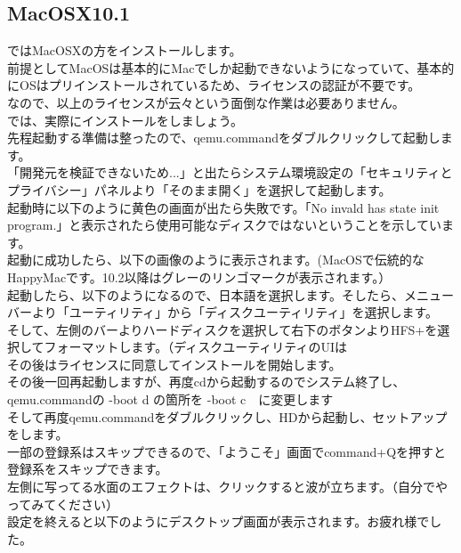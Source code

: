 \documentclass[b5paper,10pt]{jsarticle}
\begin{document}
\begin{multicols*}{3}
\begin{lstlistng}[saitama]
{\subsection{MacOSX10.1}
ではMacOSXの方をインストールします。\\
前提としてMacOSは基本的にMacでしか起動できないようになっていて、基本的にOSはプリインストールされているため、ライセンスの認証が不要です。\\
なので、以上のライセンスが云々という面倒な作業は必要ありません。\\
では、実際にインストールをしましょう。\\
先程起動する準備は整ったので、qemu.commandをダブルクリックして起動します。\\
「開発元を検証できないため...」と出たらシステム環境設定の「セキュリティとプライバシー」パネルより「そのまま開く」を選択して起動します。\\
起動時に以下のように黄色の画面が出たら失敗です。「No invald has state init program.」と表示されたら使用可能なディスクではないということを示しています。\\
起動に成功したら、以下の画像のように表示されます。(MacOSで伝統的なHappyMacです。10.2以降はグレーのリンゴマークが表示されます。）\\
起動したら、以下のようになるので、日本語を選択します。そしたら、メニューバーより「ユーティリティ」から「ディスクユーティリティ」を選択します。\\
そして、左側のバーよりハードディスクを選択して右下のボタンよりHFS+を選択してフォーマットします。（ディスクユーティリティのUIは\\
その後はライセンスに同意してインストールを開始します。\\
その後一回再起動しますが、再度cdから起動するのでシステム終了し、qemu.commandの -boot d の箇所を -boot c　に変更します\\
そして再度qemu.commandをダブルクリックし、HDから起動し、セットアップをします。\\
一部の登録系はスキップできるので、「ようこそ」画面でcommand+Qを押すと登録系をスキップできます。\\
左側に写ってる水面のエフェクトは、クリックすると波が立ちます。（自分でやってみてください）\\
設定を終えると以下のようにデスクトップ画面が表示されます。お疲れ様でした。\\
}
\end{lstlistng}
\end{multicols*}
\end{document}
